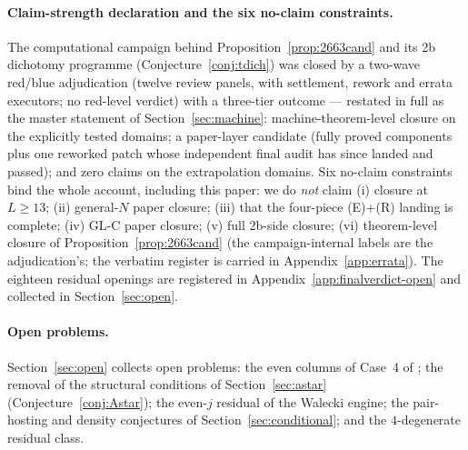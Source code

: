 \paragraph{Claim-strength declaration and the six no-claim constraints.}
The computational campaign behind Proposition~\ref{prop:2663cand} and its
2b dichotomy programme (Conjecture~\ref{conj:tdich}) was closed by a two-wave red/blue adjudication
(twelve review panels, with settlement, rework and errata executors; no
red-level verdict) with a three-tier outcome --- restated in full as the master statement of
Section~\ref{sec:machine}: machine-theorem-level closure
on the explicitly tested domains; a paper-layer candidate (fully proved
components plus one reworked patch whose independent final audit has
since landed and passed); and zero claims on the extrapolation domains. Six no-claim
constraints bind the whole account, including this paper: we do \emph{not} claim
(i) closure at $L\ge13$; (ii) general-$N$ paper closure; (iii) that the
four-piece (E)+(R) landing is complete; (iv) GL-C paper closure; (v) full
2b-side closure; (vi) theorem-level closure of
Proposition~\ref{prop:2663cand} (the campaign-internal labels are the
adjudication's; the verbatim register is carried in Appendix~\ref{app:errata}).
The eighteen residual openings are registered in
Appendix~\ref{app:finalverdict-open} and collected in Section~\ref{sec:open}.

\paragraph{Open problems.}
Section~\ref{sec:open} collects open problems: the even columns of Case~4 of \cite{CE18};
the removal of the structural conditions of Section~\ref{sec:astar}
(Conjecture~\ref{conj:Astar}); the even-$j$ residual of the Walecki engine; the
pair-hosting and density conjectures of Section~\ref{sec:conditional}; and the $4$-degenerate
residual class.

